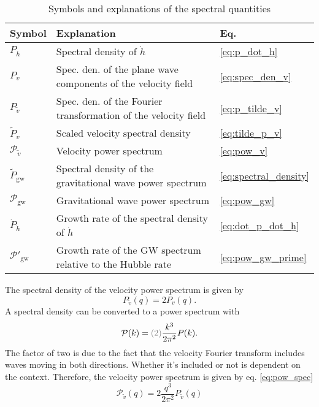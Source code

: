 \begin{table}[ht]
\caption{Symbols and explanations of the spectral quantities}
\begin{tabular}{l|l|l}
Symbol & Explanation & Eq.\\
\hline
$P_{\dot{h}}$ & Spectral density of $\dot{h}$ & \eqref{eq:p_dot_h} \\
$P_v$ & Spec. den. of the plane wave components of the velocity field & \eqref{eq:spec_den_v} \\
$P_{\tilde{v}}$ & Spec. den. of the Fourier transformation of the velocity field & \eqref{eq:p_tilde_v} \\
$\tilde{P}_v$ & Scaled velocity spectral density & \eqref{eq:tilde_p_v} \\
$\mathcal{P}_{\tilde{v}}$ & Velocity power spectrum & \eqref{eq:pow_v} \\
$\tilde{P}_\text{gw}$ & Spectral density of the gravitational wave power spectrum & \eqref{eq:spectral_density} \\
$\mathcal{P}_\text{gw}$ & Gravitational wave power spectrum & \eqref{eq:pow_gw} \\
$\dot{P}_{\dot{h}}$ & Growth rate of the spectral density of $\dot{h}$ & \eqref{eq:dot_p_dot_h} \\
$\mathcal{P}'_{\text{gw}}$ & Growth rate of the GW spectrum relative to the Hubble rate & \eqref{eq:pow_gw_prime}
\end{tabular}
\label{table:symbols}
\end{table}

The spectral density of the velocity power spectrum is given by
\begin{equation}
P_{\tilde{v}} (q) = 2 P_v (q).
\label{eq:p_tilde_v}
\end{equation}
A spectral density can be converted to a power spectrum with
\begin{equation}
\mathcal{P}(k) = \textcolor{gray}{(2)} \frac{k^3}{2 \pi^2} P(k).
\label{eq:pow_spec}
\end{equation}
The factor of two is due to the fact that the velocity Fourier transform includes waves moving in both directions.
Whether it's included or not is dependent on the context.
Therefore, the velocity power spectrum is given by eq. \eqref{eq:pow_spec} \cite[eq. 4.18]{hindmarsh_gw_pt_2019}
\begin{equation}
\mathcal{P}_{\tilde{v}} (q) = 2 \frac{q^3}{2\pi^2} P_{\tilde{v}} (q)
\label{eq:pow_v}
\end{equation}

